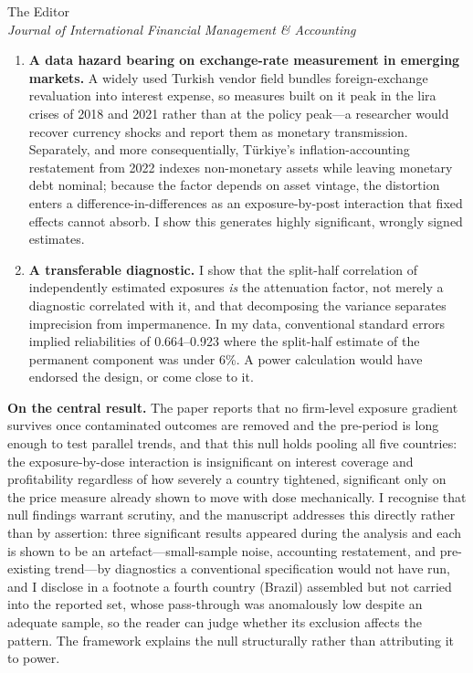 \documentclass[11pt]{letter}
\begin{document}
\begin{letter}{The Editor\\ \emph{Journal of International
Financial Management \& Accounting}}
\begin{enumerate}
\item \textbf{A data hazard bearing on exchange-rate measurement in emerging
markets.} A widely used Turkish vendor field bundles foreign-exchange
revaluation into interest expense, so measures built on it peak in the lira
crises of 2018 and 2021 rather than at the policy peak---a researcher would
recover currency shocks and report them as monetary transmission. Separately,
and more consequentially, T\"{u}rkiye's inflation-accounting restatement from
2022 indexes non-monetary assets while leaving monetary debt nominal; because
the factor depends on asset vintage, the distortion enters a
difference-in-differences as an exposure-by-post interaction that fixed
effects cannot absorb. I show this generates highly significant, wrongly
signed estimates.

\item \textbf{A transferable diagnostic.} I show that the split-half
correlation of independently estimated exposures \emph{is} the attenuation
factor, not merely a diagnostic correlated with it, and that decomposing the
variance separates imprecision from impermanence. In my data, conventional
standard errors implied reliabilities of 0.664--0.923 where the split-half
estimate of the permanent component was under 6\%. A power calculation would
have endorsed the design, or come close to it.
\end{enumerate}

\textbf{On the central result.} The paper reports that no firm-level exposure
gradient survives once contaminated outcomes are removed and the pre-period is
long enough to test parallel trends, and that this null holds pooling all five
countries: the exposure-by-dose interaction is insignificant on interest
coverage and profitability regardless of how severely a country tightened,
significant only on the price measure already shown to move with dose
mechanically. I recognise that null findings warrant scrutiny, and the
manuscript addresses this directly rather than by assertion: three significant
results appeared during the analysis and each is shown to be an
artefact---small-sample noise, accounting restatement, and pre-existing
trend---by diagnostics a conventional specification would not have run, and I
disclose in a footnote a fourth country (Brazil) assembled but not carried
into the reported set, whose pass-through was anomalously low despite an
adequate sample, so the reader can judge whether its exclusion affects the
pattern. The framework explains the null structurally rather than attributing
it to power.


\end{letter}
\end{document}
